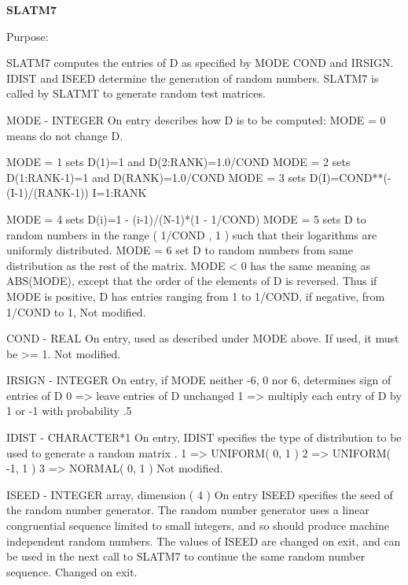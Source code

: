 {\bfseries S\+L\+A\+T\+M7} 

\begin{DoxyParagraph}{Purpose\+: }
\begin{DoxyVerb}    SLATM7 computes the entries of D as specified by MODE
    COND and IRSIGN. IDIST and ISEED determine the generation
    of random numbers. SLATM7 is called by SLATMT to generate
    random test matrices.\end{DoxyVerb}
 \begin{DoxyVerb}  MODE   - INTEGER
           On entry describes how D is to be computed:
           MODE = 0 means do not change D.

           MODE = 1 sets D(1)=1 and D(2:RANK)=1.0/COND
           MODE = 2 sets D(1:RANK-1)=1 and D(RANK)=1.0/COND
           MODE = 3 sets D(I)=COND**(-(I-1)/(RANK-1)) I=1:RANK

           MODE = 4 sets D(i)=1 - (i-1)/(N-1)*(1 - 1/COND)
           MODE = 5 sets D to random numbers in the range
                    ( 1/COND , 1 ) such that their logarithms
                    are uniformly distributed.
           MODE = 6 set D to random numbers from same distribution
                    as the rest of the matrix.
           MODE < 0 has the same meaning as ABS(MODE), except that
              the order of the elements of D is reversed.
           Thus if MODE is positive, D has entries ranging from
              1 to 1/COND, if negative, from 1/COND to 1,
           Not modified.

  COND   - REAL
           On entry, used as described under MODE above.
           If used, it must be >= 1. Not modified.

  IRSIGN - INTEGER
           On entry, if MODE neither -6, 0 nor 6, determines sign of
           entries of D
           0 => leave entries of D unchanged
           1 => multiply each entry of D by 1 or -1 with probability .5

  IDIST  - CHARACTER*1
           On entry, IDIST specifies the type of distribution to be
           used to generate a random matrix .
           1 => UNIFORM( 0, 1 )
           2 => UNIFORM( -1, 1 )
           3 => NORMAL( 0, 1 )
           Not modified.

  ISEED  - INTEGER array, dimension ( 4 )
           On entry ISEED specifies the seed of the random number
           generator. The random number generator uses a
           linear congruential sequence limited to small
           integers, and so should produce machine independent
           random numbers. The values of ISEED are changed on
           exit, and can be used in the next call to SLATM7
           to continue the same random number sequence.
           Changed on exit.


\end{DoxyVerb}
\end{DoxyParagraph}
